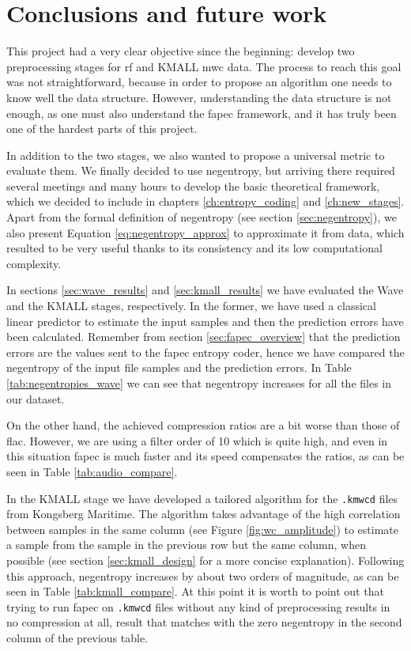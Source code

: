 \chapter{Conclusions and future work}
This project had a very clear objective since the beginning: develop two preprocessing stages for \acrfull{rf} and KMALL \acrshort{mwc} data. The process to reach this goal was not straightforward, because in order to propose an algorithm one needs to know well the data structure. However, understanding the data structure is not enough, as one must also understand the \acrshort{fapec} framework, and it has truly been one of the hardest parts of this project.

In addition to the two stages, we also wanted to propose a universal metric to evaluate them. We finally decided to use negentropy, but arriving there required several meetings and many hours to develop the basic theoretical framework, which we decided to include in chapters \ref{ch:entropy_coding} and \ref{ch:new_stages}. Apart from the formal definition of negentropy (see section \ref{sec:negentropy}), we also present Equation \ref{eq:negentropy_approx} to approximate it from data, which resulted to be very useful thanks to its consistency and its low computational complexity.

In sections \ref{sec:wave_results} and \ref{sec:kmall_results} we have evaluated the Wave and the KMALL stages, respectively. In the former, we have used a classical linear predictor to estimate the input samples and then the prediction errors have been calculated. Remember from section \ref{sec:fapec_overview} that the prediction errors are the values sent to the \acrshort{fapec} entropy coder, hence we have compared the negentropy of the input file samples and the prediction errors. In Table \ref{tab:negentropies_wave} we can see that negentropy increases for all the files in our dataset.

On the other hand, the achieved compression ratios are a bit worse than those of \acrshort{flac}. However, we are using a filter order of 10 which is quite high, and even in this situation \acrshort{fapec} is much faster and its speed compensates the ratios, as can be seen in Table \ref{tab:audio_compare}.

In the KMALL stage we have developed a tailored algorithm for the \texttt{.kmwcd} files from Kongsberg Maritime. The algorithm takes advantage of the high correlation between samples in the same column (see Figure \ref{fig:wc_amplitude}) to estimate a sample from the sample in the previous row but the same column, when possible (see section \ref{sec:kmall_design} for a more concise explanation). Following this approach, negentropy increases by about two orders of magnitude, as can be seen in Table \ref{tab:kmall_compare}. At this point it is worth to point out that trying to run \acrshort{fapec} on \texttt{.kmwcd} files without any kind of preprocessing results in no compression at all, result that matches with the zero negentropy in the second column of the previous table.

